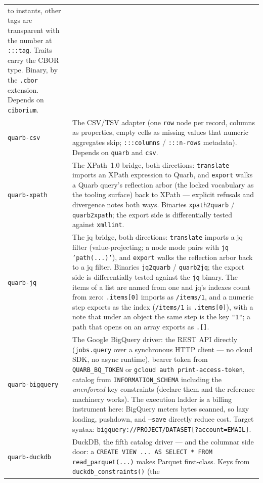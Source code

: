 \documentclass{report}
\begin{document}
\begin{xltabular}{\textwidth}{l X}
  to instants, other tags are transparent with the number at
  \texttt{:::tag}. Traits carry the CBOR type. Binary, by the
  \texttt{.cbor} extension. Depends on \texttt{ciborium}. \\
\texttt{quarb-csv} & The CSV/TSV adapter (one \texttt{row} node per
  record, columns as properties, empty cells as missing values that
  numeric aggregates skip; \texttt{:::columns} / \texttt{:::n-rows}
  metadata). Depends on \texttt{quarb} and \texttt{csv}. \\
\texttt{quarb-xpath} & The XPath~1.0 bridge, both directions:
  \texttt{translate} imports an XPath expression to Quarb, and
  \texttt{export} walks a Quarb query's reflection arbor (the
  locked vocabulary as the tooling surface) back to XPath —
  explicit refusals and divergence notes both ways. Binaries
  \texttt{xpath2quarb} / \texttt{quarb2xpath}; the export side is
  differentially tested against \texttt{xmllint}. \\
\texttt{quarb-jq} & The jq bridge, both directions:
  \texttt{translate} imports a jq filter (value-projecting; a node
  mode pairs with \texttt{jq 'path(...)'}), and \texttt{export}
  walks the reflection arbor back to a jq filter. Binaries
  \texttt{jq2quarb} / \texttt{quarb2jq}; the export side is
  differentially tested against the \texttt{jq} binary. The items
  of a list are named from one and jq's indexes count from zero:
  \texttt{.items[0]} imports as \texttt{/items/1}, and a numeric
  step exports as the index (\texttt{/items/1} is
  \texttt{.items[0]}), with a note that under an object the same
  step is the key \texttt{"1"}; a path that opens on an array
  exports as \texttt{.[]}. \\
\texttt{quarb-bigquery} & The Google BigQuery driver: the
  REST API directly (\texttt{jobs.query} over a synchronous HTTP
  client — no cloud SDK, no async runtime), bearer token from
  \texttt{QUARB\_BQ\_TOKEN} or \texttt{gcloud auth
  print-access-token}, catalog from
  \texttt{INFORMATION\_SCHEMA} including the \emph{unenforced}
  key constraints (declare them and the reference machinery
  works). The execution ladder is a billing instrument here:
  BigQuery meters bytes scanned, so lazy loading, pushdown, and
  \texttt{--save} directly reduce cost. Target syntax:
  \texttt{bigquery://PROJECT/DATASET[?account=EMAIL]}. \\
\texttt{quarb-duckdb} & DuckDB, the fifth catalog driver —
  and the columnar side door: a \texttt{CREATE VIEW ... AS
  SELECT * FROM read\_parquet(...)} makes Parquet first-class.
  Keys from \texttt{duckdb\_constraints()} (the

\end{xltabular}
\end{document}

